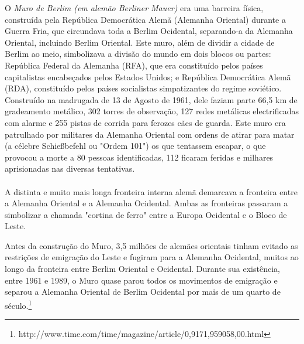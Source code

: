 %
\maketitle
O \emph{Muro de Berlim (em alemão Berliner Mauer)} era uma barreira física, construída pela República Democrática Alemã (Alemanha Oriental) durante a Guerra Fria, que circundava toda a Berlim Ocidental, separando-a da Alemanha Oriental, incluindo Berlim Oriental. Este muro, além de dividir a cidade de Berlim ao meio, simbolizava a divisão do mundo em dois blocos ou partes: República Federal da Alemanha (RFA), que era constituído pelos países capitalistas encabeçados pelos Estados Unidos; e República Democrática Alemã (RDA), constituído pelos países socialistas simpatizantes do regime soviético. Construído na madrugada de 13 de Agosto de 1961, dele faziam parte 66,5 km de gradeamento metálico, 302 torres de observação, 127 redes metálicas electrificadas com alarme e 255 pistas de corrida para ferozes cães de guarda. Este muro era patrulhado por militares da Alemanha Oriental com ordens de atirar para matar (a célebre Schießbefehl ou "Ordem 101") os que tentassem escapar, o que provocou a morte a 80 pessoas identificadas, 112 ficaram feridas e milhares aprisionadas nas diversas tentativas.\\ \\
A distinta e muito mais longa fronteira interna alemã demarcava a fronteira entre a Alemanha Oriental e a Alemanha Ocidental. Ambas as fronteiras passaram a simbolizar a chamada "cortina de ferro" entre a Europa Ocidental e o Bloco de Leste.

Antes da construção do Muro, 3,5 milhões de alemães orientais tinham evitado as restrições de emigração do Leste e fugiram para a Alemanha Ocidental, muitos ao longo da fronteira entre Berlim Oriental e Ocidental. Durante sua existência, entre 1961 e 1989, o Muro quase parou todos os movimentos de emigração e separou a Alemanha Oriental de Berlim Ocidental por mais de um quarto de século.\footnote{http://www.time.com/time/magazine/article/0,9171,959058,00.html}

